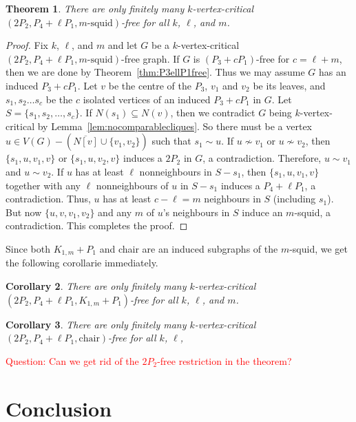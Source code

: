 \documentclass[11pt]{article}
\newtheorem{theorem}{Theorem}[section]
\newtheorem{corollary}[theorem]{Corollary}
\theoremstyle{definition}
\newcommand{\noneighbs}{\overline{N[v]}}
\begin{document}
\begin{theorem}
There are only finitely many $k$-vertex-critical $(2P_2,P_4+\ell P_1,m\text{-squid})$-free for all $k$, $\ell$, and $m$.
\end{theorem}
\begin{proof}
Fix $k$, $\ell$, and $m$ and let $G$ be a $k$-vertex-critical $(2P_2,P_4+\ell P_1,m\text{-squid})$-free graph. If $G$ is $(P_3+c P_1)$-free for $c= \ell+m$, then we are done by Theorem~\ref{thm:P3ellP1free}. Thus we may assume $G$ has an induced $P_3+c P_1$. Let $v$ be the centre of the $P_3$, $v_1$ and $v_2$ be its leaves, and $s_1,s_2\ldots s_c$ be the $c$ isolated vertices of an induced $P_3+c P_1$ in $G$. Let $S=\{s_1,s_2,\dots,s_c\}$. If $N(s_1)\subseteq N(v)$, then we contradict $G$ being $k$-vertex-critical by Lemma~\ref{lem:nocomparablecliques}. So there must be a vertex $u\in V(G)-(\noneighbs\cup \{v_1,v_2\})$ such that $s_1\sim u$. If $u\nsim v_1$ or $u\nsim v_2$, then $\{s_1,u,v_1,v\}$ or $\{s_1,u,v_2,v\}$ induces a $2P_2$ in $G$, a contradiction. Therefore, $u\sim v_1$ and $u\sim v_2$. If $u$ has at least $\ell$ nonneighbours in $S-s_1$, then $\{s_1,u,v_1,v\}$ together with any $\ell$ nonneighbours of $u$ in  $S-s_1$ induces a $P_4+\ell P_1$, a contradiction. Thus, $u$ has at least $c-\ell=m$ neighbours in $S$ (including $s_1$). But now $\{u,v,v_1,v_2\}$ and any $m$ of $u$'s neighbours in $S$ induce an $m$-squid, a contradiction. This completes the proof.
\end{proof}

Since both $K_{1,m}+P_1$ and chair are an induced subgraphs of the $m$-squid, we get the following corollarie immediately.

\begin{corollary}
There are only finitely many $k$-vertex-critical $(2P_2,P_4+\ell P_1,K_{1,m}+P_1)$-free for all $k$, $\ell$, and $m$.
\end{corollary}

\begin{corollary}
There are only finitely many $k$-vertex-critical $(2P_2,P_4+\ell P_1,\text{chair})$-free for all $k$, $\ell$,
\end{corollary}




\textcolor{red}{Question: Can we get rid of the $2P_2$-free restriction in the theorem?}


\section{Conclusion}
\end{document}
